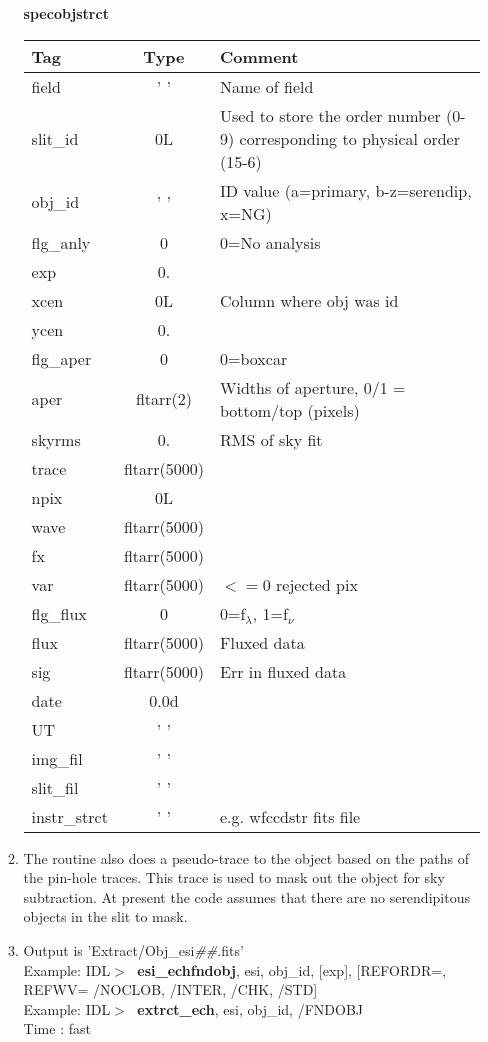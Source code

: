 \documentclass[11pt,letterpaper,dvips]{article}
\begin{document}
\begin{enumerate}
\begin{enumerate}
	\begin{center}
	  {\Large {\bf specobjstrct} }
	\end{center}
	{\small
	\begin{tabular}{lcl}
	  \hline
	  Tag & Type & Comment \\
	  \hline
         field &  ' ' &  Name of field \\
         slit\_id &  0L & Used to store the order number (0-9) corresponding to
				physical order (15-6)\\  
         obj\_id &  ' ' & ID value (a=primary, b-z=serendip, x=NG) \\
         flg\_anly &  0 &  0=No analysis\\ 
         exp &  0. & \\
         xcen &  0L &  Column where obj was id\\
         ycen &  0. & \\
         flg\_aper &  0 &  0=boxcar\\
         aper &  fltarr(2) &  Widths of aperture, 0/1 = bottom/top (pixels)\\
         skyrms &  0. &  RMS of sky fit\\
         trace &  fltarr(5000) &\\
         npix &  0L & \\
         wave &  fltarr(5000) & \\
         fx &  fltarr(5000) & \\
         var &  fltarr(5000) &    $<=0$  rejected pix\\
         flg\_flux & 0 &    0=f$_\lambda$, 1=f$_\nu$\\
         flux &  fltarr(5000) &    Fluxed data\\
         sig &  fltarr(5000) &    Err in fluxed data\\
         date &  0.0d \\
         UT &  ' ' \\
         img\_fil &  ' ' \\
         slit\_fil &  ' ' \\
         instr\_strct &  ' ' & e.g. wfccdstr fits file\\
	  \hline
	\end{tabular}
	}

	\item The routine also does a pseudo-trace to the object based on the
	paths of the pin-hole traces.  This trace is used to mask out the
	object for sky subtraction.  At present the code assumes that there
	are no serendipitous objects in the slit to mask.
	\item Output is 'Extract/Obj\_esi{\it \#\#}.fits' \\
         \quad Example: IDL$> \;$ {\bf esi\_echfndobj}, esi, obj\_id, [exp], 
		[REFORDR=, REFWV= /NOCLOB, /INTER, /CHK, /STD] \\
         \quad Example: IDL$> \;$ {\bf extrct\_ech}, esi, obj\_id, /FNDOBJ \\
         \quad Time   : fast 


\end{enumerate}
\end{enumerate}
\end{document}
